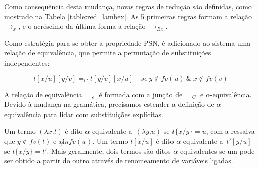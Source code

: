 Como consequência desta mudança, novas regras de redução são definidas, como
mostrado na Tabela \ref{table:red_lambex}.  As 5 primeiras regras formam a
relação $\rightarrow_x$, e o acréscimo da última forma a relação
$\rightarrow_{Bx}$. 






Como estratégia para se obter a propriedade PSN, é adicionado ao sistema uma
relação de equivalência, que permite a permutação de substituições independentes:

\[ t[x/u][y/v] =_C t[y/v][x/u] \ \ \ \ \ se\ y \notin fv(u)\ \&\ x \notin fv(v)\] 

A relação de equivalência $=_e$ é formada com a junção de $=_C$ e
$\alpha$-equivalência. Devido à mudança na gramática, precisamos estender a
definição de $\alpha$-equivalência para lidar com substituições explícitas.


\begin{definicao}
    Um termo $(\lambda x. t)$ é dito $\alpha$-equivalente a\ $(\lambda y. u)$ se
    $ t\{x/y\} = u $, com a ressalva que $y \notin fv(t)$ e $x \not in fv(u)$.
    Um termo $t[x/u]$ é dito $\alpha$-equivalente a\ $t'[y/u]$ se $ t\{x/y\} =
    t' $. Mais geralmente, dois termos são ditos $\alpha$-equivalentes se um
    pode ser obtido a partir do outro através de renomeamento de variáveis
    ligadas.

\end{definicao}

